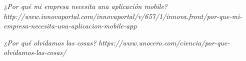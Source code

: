 \begin{thebibliography}{X}
	 \textit{¿Por qué mi empresa necesita una aplicación mobile?} \textit{http://www.innovaportal.com/innovaportal/v/657/1/innova.front/por-que-mi-empresa-necesita-una-aplicacion-mobile-app} 
	
	 \textit{¿Por qué olvidamos las cosas?} \textit{https://www.unocero.com/ciencia/por-que-olvidamos-las-cosas/} 
	
	
	
		 
	
	 
\end{thebibliography}